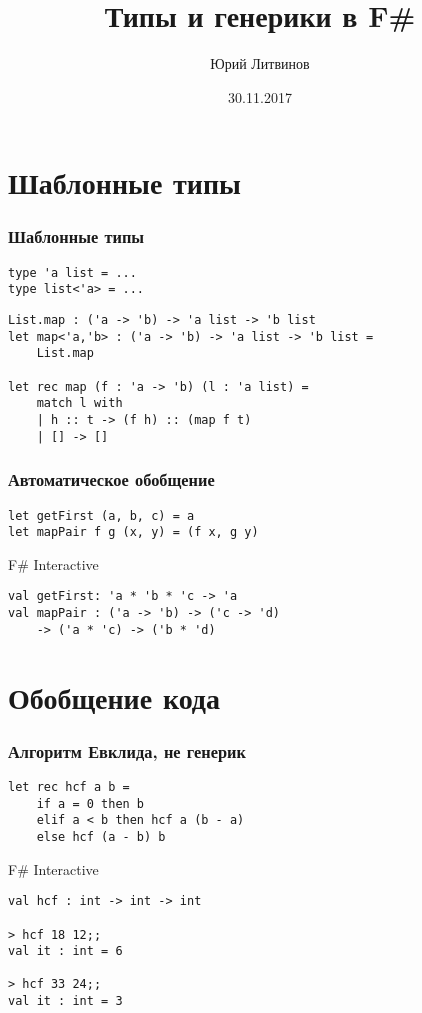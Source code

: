 \documentclass[xetex,mathserif,serif]{beamer}
\title{Типы и генерики в F\#}
\author{Юрий Литвинов}
\date{30.11.2017}
\begin{document}
	
	\frame{\titlepage}
	
	\section{Шаблонные типы}
	
	\begin{frame}[fragile]
		\frametitle{Шаблонные типы}
		\begin{verbatim}
type 'a list = ...
type list<'a> = ...
		\end{verbatim}

		\begin{verbatim}
List.map : ('a -> 'b) -> 'a list -> 'b list
let map<'a,'b> : ('a -> 'b) -> 'a list -> 'b list = 
    List.map

let rec map (f : 'a -> 'b) (l : 'a list) =
    match l with
    | h :: t -> (f h) :: (map f t)
    | [] -> []
		\end{verbatim}
\end{frame}

	\begin{frame}[fragile]
		\frametitle{Автоматическое обобщение}
		\begin{verbatim}
let getFirst (a, b, c) = a
let mapPair f g (x, y) = (f x, g y)
		\end{verbatim}

		\begin{alertblock}{F\# Interactive}
			\begin{verbatim}
val getFirst: 'a * 'b * 'c -> 'a
val mapPair : ('a -> 'b) -> ('c -> 'd) 
    -> ('a * 'c) -> ('b * 'd)
			\end{verbatim}
		\end{alertblock}
\end{frame}
	
	\section{Обобщение кода}

	\begin{frame}[fragile]
		\frametitle{Алгоритм Евклида, не генерик}
		\begin{verbatim}
let rec hcf a b =
    if a = 0 then b
    elif a < b then hcf a (b - a)
    else hcf (a - b) b
		\end{verbatim}

		\begin{alertblock}{F\# Interactive}
			\begin{verbatim}
val hcf : int -> int -> int

> hcf 18 12;;
val it : int = 6

> hcf 33 24;;
val it : int = 3
			\end{verbatim}
		\end{alertblock}
\end{frame}
\end{document}
